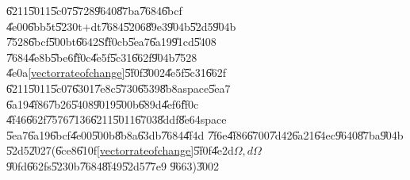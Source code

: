 \documentclass[12pt]{article}
\begin{document}
\bigskip \U{6211}\U{5011}\U{5c07}\U{5728}\U{9640}\U{87ba}\U{7684}\U{6bcf}%
\U{4e00}\U{6bb5}t\U{5230}t+dt\U{7684}\U{5206}\U{89e3}\U{904b}\U{52d5}\U{904b}%
\U{7528}\U{6bcf}\U{500b}t\U{6642}S\U{ff0c}b\U{5ea7}\U{6a19}\U{91cd}\U{5408}%
\U{7684}\U{4e8b}\U{5be6}\U{ff0c}\U{4e5f}\U{5c31}\U{662f}\U{904b}\U{7528}%
\U{4e0a}\ref{vectorrateofchange}\U{5f0f}\U{3002}\U{4e5f}\U{5c31}\U{662f}%
\U{6211}\U{5011}\U{5c07}\U{6301}\U{7e8c}\U{5730}\U{6539}\U{8b8a}space\U{5ea7}%
\U{6a19}\U{4f86}\U{7b26}\U{5408}\U{9019}\U{500b}\U{689d}\U{4ef6}\U{ff0c}%
\U{4f46}\U{662f}\U{7576}\U{7136}\U{6211}\U{5011}\U{6703}\U{8ddf}\U{8e64}space%
\U{5ea7}\U{6a19}\U{6bcf}\U{4e00}\U{500b}\U{8b8a}\U{63db}\U{7684}\U{4f4d}%
\U{7f6e}\U{4f86}\U{6700}\U{7d42}\U{6a21}\U{64ec}\U{9640}\U{87ba}\U{904b}%
\U{52d5}\U{2027}(\U{6ce8}\U{610f}\ref{vectorrateofchange}\U{5f0f}\U{4e2d}$%
\Omega ,d\Omega $\U{90fd}\U{662f}s\U{5230}b\U{7684}\U{8f49}\U{52d5}\U{77e9}%
\U{9663})\U{3002}
\end{document}
